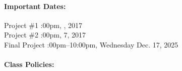\documentclass[11pt, a4paper]{article}
\begin{document}
\paragraph{Important Dates:}
\begin{center} \begin{minipage}{3.8in}
\begin{flushleft}
Project \#1      :00pm, , 2017 \\
Project \#2      :00pm, 7, 2017\\
Final Project    :00pm--10:00pm, Wednesday Dec. 17, 2025\\
\end{flushleft}
\end{minipage}
\end{center}

\paragraph{Class Policies:}
\end{document}
